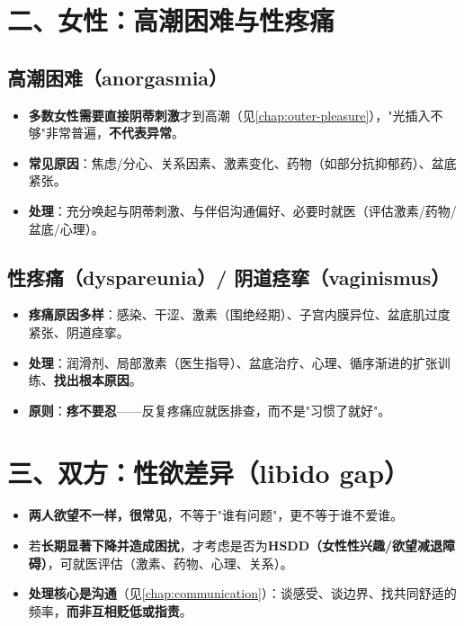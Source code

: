 \documentclass[12pt,UTF8,openany]{ctexbook}
\begin{document}
\section{二、女性：高潮困难与性疼痛}

\subsection*{高潮困难（anorgasmia）}
\begin{itemize}[leftmargin=2em,itemsep=0.3em]
  \item \textbf{多数女性需要直接阴蒂刺激}才到高潮（见\ref{chap:outer-pleasure}），"光插入不够"非常普遍，\textbf{不代表异常}。
  \item \textbf{常见原因}：焦虑/分心、关系因素、激素变化、药物（如部分抗抑郁药）、盆底紧张。
  \item \textbf{处理}：充分唤起与阴蒂刺激、与伴侣沟通偏好、必要时就医（评估激素/药物/盆底/心理）。
\end{itemize}

\subsection*{性疼痛（dyspareunia）/ 阴道痉挛（vaginismus）}
\begin{itemize}[leftmargin=2em,itemsep=0.3em]
  \item \textbf{疼痛原因多样}：感染、干涩、激素（围绝经期）、子宫内膜异位、盆底肌过度紧张、阴道痉挛。
  \item \textbf{处理}：润滑剂、局部激素（医生指导）、盆底治疗、心理、循序渐进的扩张训练、\textbf{找出根本原因}。
  \item \textbf{原则}：\textbf{疼不要忍}——反复疼痛应就医排查，而不是"习惯了就好"。
\end{itemize}

\section{三、双方：性欲差异（libido gap）}

\begin{itemize}[leftmargin=2em,itemsep=0.3em]
  \item \textbf{两人欲望不一样，很常见}，不等于"谁有问题"，更不等于谁不爱谁。
  \item 若\textbf{长期显著下降并造成困扰}，才考虑是否为\textbf{HSDD（女性性兴趣/欲望减退障碍）}，可就医评估（激素、药物、心理、关系）。
  \item \textbf{处理核心是沟通}（见\ref{chap:communication}）：谈感受、谈边界、找共同舒适的频率，\textbf{而非互相贬低或指责}。
\end{itemize}
\end{document}
